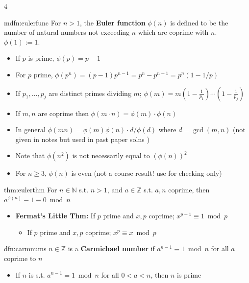 \documentclass[landscape, 8pt]{extarticle}
\begin{document}
\begin{multicols*}{4}
		\begin{mdfn}{mdfn:eulerfunc}{ }
			For $n>1$, the \textbf{Euler function} $\phi(n)$ is defined to be the number of natural numbers not exceeding $n$ which are coprime with $n$. $\phi(1) := 1$.
			\begin{itemize}
				\item If $p$ is prime, $\phi(p) = p-1$
				\item For $p$ prime, $\phi(p^n) = (p-1)p^{n-1} = p^n - p^{n-1} = p^n(1-1/p)$
				\item If $p_1, \dots, p_j$ are distinct primes dividing $m$; $\phi(m) = m(1-\frac{1}{p_1}) \cdots (1-\frac{1}{p_j})$
				\item If $m, n$ are coprime then $\phi(m \cdot n) = \phi(m) \cdot \phi(n)$
				\item In general $\phi(mn) = \phi(m)\phi(n) \cdot d/\phi(d)$ where $d = \gcd(m, n)$ (not given in notes but used in past paper solns {\footnotesize \smiley})
				\item Note that $\phi(n^2)$ is not necessarily equal to $(\phi(n))^2$
				\item For $n \ge 3$, $\phi(n)$ is even (not a course result! use for checking only)
			\end{itemize}
			
		\end{mdfn}
		
		
		\begin{mthm}{thm:eulerthm}{ }
			For $n\in \mathbb{N}$ s.t. $n > 1$, and $a\in \mathbb{Z}$ s.t. $a, n$ coprime, then $a^{\phi(n)} - 1 \equiv 0 \bmod{n}$
			\begin{itemize}
				\item \textbf{Fermat's Little Thm:} If $p$ prime and $x, p$ coprime; $x^{p-1} \equiv 1 \bmod{p}$
				\begin{itemize}
					\item If $p$ prime and $x, p$ coprime; $x^p \equiv x \bmod{p}$
				\end{itemize}
			\end{itemize}
			
		\end{mthm}
		
		
		\begin{dfn}{dfn:carmnums}{ }
			$n\in \mathbb{Z}$ is a \textbf{Carmichael number} if $a^{n-1} \equiv 1 \bmod{n}$ for all $a$ coprime to $n$
			\begin{itemize}
				\item If $n$ is s.t. $a^{n-1} = 1 \bmod{n}$ for all $0 < a < n$, then $n$ is prime
			\end{itemize}
			

\end{dfn}
\end{multicols*}
\end{document}
